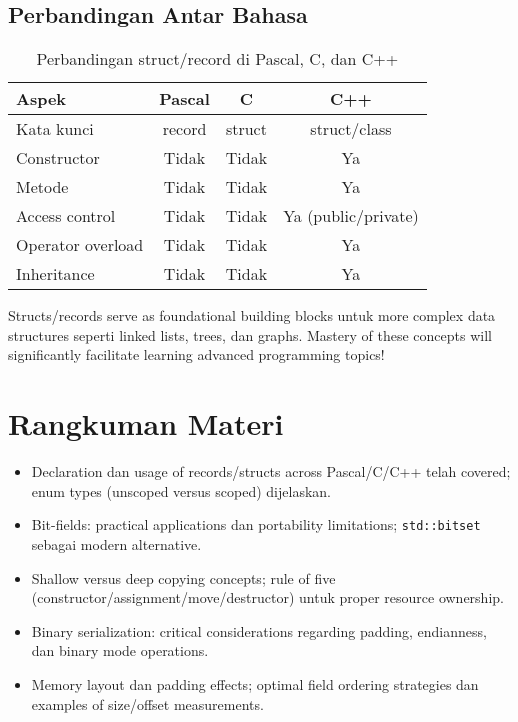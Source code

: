 \documentclass[../main.tex]{subfiles}
\begin{document}
\subsection{Perbandingan Antar Bahasa}

\begin{table}[H]
\centering
\begin{tabular}{|l|c|c|c|}
\hline
\textbf{Aspek} & \textbf{Pascal} & \textbf{C} & \textbf{C++} \\
\hline
Kata kunci & record & struct & struct/class \\
\hline
Constructor & Tidak & Tidak & Ya \\
\hline
Metode & Tidak & Tidak & Ya \\
\hline
Access control & Tidak & Tidak & Ya (public/private) \\
\hline
Operator overload & Tidak & Tidak & Ya \\
\hline
Inheritance & Tidak & Tidak & Ya \\
\hline
\end{tabular}
\caption{Perbandingan struct/record di Pascal, C, dan C++}
\end{table}

Structs/records serve as foundational building blocks untuk more complex data structures seperti linked lists, trees, dan graphs. Mastery of these concepts will significantly facilitate learning advanced programming topics!

\section{Rangkuman Materi}
\begin{itemize}
  \item Declaration dan usage of records/structs across Pascal/C/C++ telah covered; enum types (unscoped versus scoped) dijelaskan.
  \item Bit-fields: practical applications dan portability limitations; \texttt{std::bitset} sebagai modern alternative.
  \item Shallow versus deep copying concepts; rule of five (constructor/assignment/move/destructor) untuk proper resource ownership.
  \item Binary serialization: critical considerations regarding padding, endianness, dan binary mode operations.
  \item Memory layout dan padding effects; optimal field ordering strategies dan examples of size/offset measurements.
\end{itemize}
\end{document}
